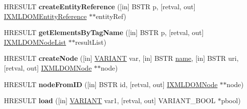 \begin{DoxyCompactItemize}
\item 
\mbox{\label{interface_m_s_x_m_l2_1_1_i_x_m_l_d_o_m_document_a214109100552b3eb47fc50d36b242055}} 
H\+R\+E\+S\+U\+LT {\bfseries create\+Entity\+Reference} (\mbox{[}in\mbox{]} B\+S\+TR p, \mbox{[}retval, out\mbox{]} \hyperlink{interface_m_s_x_m_l2_1_1_i_x_m_l_d_o_m_entity_reference}{I\+X\+M\+L\+D\+O\+M\+Entity\+Reference} $\ast$$\ast$entity\+Ref)
\item 
\mbox{\label{interface_m_s_x_m_l2_1_1_i_x_m_l_d_o_m_document_a1b3f369dcb374a151da24e588a40b19c}} 
H\+R\+E\+S\+U\+LT {\bfseries get\+Elements\+By\+Tag\+Name} (\mbox{[}in\mbox{]} B\+S\+TR p, \mbox{[}retval, out\mbox{]} \hyperlink{interface_m_s_x_m_l2_1_1_i_x_m_l_d_o_m_node_list}{I\+X\+M\+L\+D\+O\+M\+Node\+List} $\ast$$\ast$result\+List)
\item 
\mbox{\label{interface_m_s_x_m_l2_1_1_i_x_m_l_d_o_m_document_a08a2554780432feb8bd6170fe0fe38a5}} 
H\+R\+E\+S\+U\+LT {\bfseries create\+Node} (\mbox{[}in\mbox{]} \hyperlink{structtag_v_a_r_i_a_n_t}{V\+A\+R\+I\+A\+NT} var, \mbox{[}in\mbox{]} B\+S\+TR \hyperlink{structname}{name}, \mbox{[}in\mbox{]} B\+S\+TR uri, \mbox{[}retval, out\mbox{]} \hyperlink{interface_m_s_x_m_l2_1_1_i_x_m_l_d_o_m_node}{I\+X\+M\+L\+D\+O\+M\+Node} $\ast$$\ast$node)
\item 
\mbox{\label{interface_m_s_x_m_l2_1_1_i_x_m_l_d_o_m_document_a751eab69e4b02f93e43f2bf797f15907}} 
H\+R\+E\+S\+U\+LT {\bfseries node\+From\+ID} (\mbox{[}in\mbox{]} B\+S\+TR id, \mbox{[}retval, out\mbox{]} \hyperlink{interface_m_s_x_m_l2_1_1_i_x_m_l_d_o_m_node}{I\+X\+M\+L\+D\+O\+M\+Node} $\ast$$\ast$node)
\item 
\mbox{\label{interface_m_s_x_m_l2_1_1_i_x_m_l_d_o_m_document_a44497bf88817e937ee1b0f14e62cec7a}} 
H\+R\+E\+S\+U\+LT {\bfseries load} (\mbox{[}in\mbox{]} \hyperlink{structtag_v_a_r_i_a_n_t}{V\+A\+R\+I\+A\+NT} var1, \mbox{[}retval, out\mbox{]} V\+A\+R\+I\+A\+N\+T\+\_\+\+B\+O\+OL $\ast$pbool)
\item 
\mbox{\label{interface_m_s_x_m_l2_1_1_i_x_m_l_d_o_m_document_a871c05778f6945b586d0aa25a103c2b5}} 

\end{DoxyCompactItemize}
